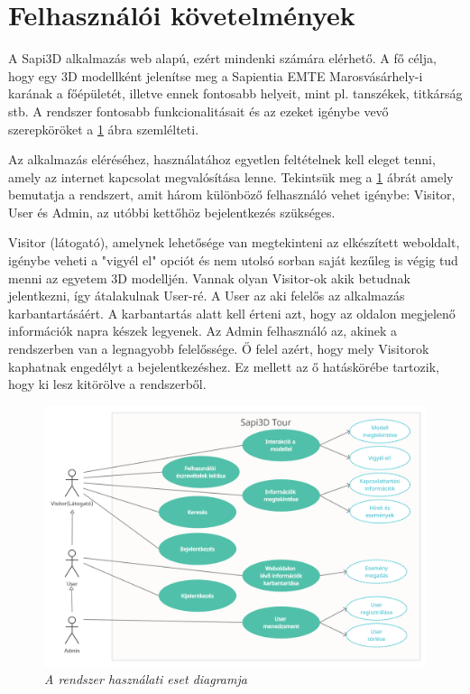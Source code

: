 \section{Felhasználói követelmények}

A Sapi3D alkalmazás web alapú, ezért mindenki számára elérhető.
A fő célja, hogy egy 3D modellként jelenítse meg a Sapientia EMTE Marosvásárhely-i karának a főépületét, illetve ennek fontosabb helyeit, mint pl. tanszékek, titkárság stb. A rendszer fontosabb funkcionalitásait és az ezeket igénybe vevő szerepköröket a \ref{fig:UseCase} ábra szemlélteti.

Az alkalmazás eléréséhez, használatához egyetlen feltételnek kell eleget tenni, amely az internet kapcsolat megvalósítása lenne. Tekintsük meg a \ref{fig:UseCase} ábrát amely bemutatja a rendszert, amit három különböző felhasználó vehet igénybe: Visitor, User és Admin, az utóbbi kettőhöz bejelentkezés szükséges.

Visitor (látogató), amelynek lehetősége van megtekinteni az elkészített weboldalt, igénybe veheti a "vigyél el" opciót és nem utolsó sorban saját kezűleg is végig tud menni az egyetem 3D modelljén. Vannak olyan Visitor-ok akik betudnak jelentkezni, így átalakulnak User-ré. A User az aki felelős az alkalmazás karbantartásáért. A karbantartás alatt kell érteni azt, hogy az oldalon megjelenő információk napra készek legyenek. Az Admin felhasználó az, akinek a rendszerben van a legnagyobb felelőssége. Ő felel azért, hogy mely Visitorok kaphatnak engedélyt a bejelentkezéshez. Ez mellett az ő hatáskörébe tartozik, hogy ki lesz kitörölve a rendszerből.
\begin{figure}[H]
	\centering
	\includegraphics[width=1\linewidth]{figures/images/Sapi3dTourUseCase.png}
	\caption[A rendszer használati eset diagramja]{\textit{A rendszer használati eset diagramja}}
	\label{fig:UseCase}
\end{figure}

